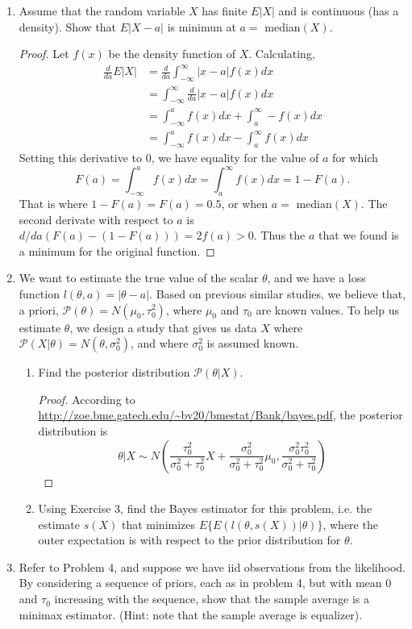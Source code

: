 \documentclass[letterpaper,12pt]{article}
\renewcommand{\P}{\mathcal{P}}
\begin{document}
\begin{enumerate}[(1)]
\begin{proof}
The simulations yielded $2.184648$ for the first expectation and $2.156$ for the second expectation.
\end{proof}

\item
Assume that the random variable $X$ has finite $E|X|$ and is continuous (has a density). Show that $E|X - a|$ is minimun at $a=$ median$(X)$.
\begin{proof}
Let $f(x)$ be the density function of $X$. Calculating,
\begin{align*}
\frac{d}{da} E|X| &= \frac{d}{da} \int_{-\infty}^{\infty} |x - a| f(x) dx \\
&= \int_{-\infty}^{\infty} \frac{d}{da}  |x - a| f(x) dx \\
&= \int_{-\infty}^{a} f(x) dx + \int_{a}^{\infty} - f(x) dx \\
&= \int_{-\infty}^{a} f(x) dx - \int_{a}^{\infty} f(x) dx
\end{align*}
Setting this derivative to $0$, we have equality for the value of $a$ for which
\[
F(a) = \int_{-\infty}^{a} f(x) dx = \int_{a}^{\infty} f(x) dx = 1 - F(a) \text{.}
\]
That is where $1 - F(a) = F(a) = 0.5$, or when $a =$ median$(X)$. The second derivate with respect to $a$ is $d/da(F(a) - (1 - F(a))) = 2f(a) >0$. Thus the $a$ that we found is a minimum for the original function.
\end{proof}

\item
We want to estimate the true value of the scalar $\theta$, and we have a loss function $l(\theta, a) = |\theta - a|$. Based on previous similar studies, we believe that, a priori, $\P(\theta) = N (\mu_0, \tau_0^2)$, where $\mu_0$ and $\tau_0$ are known values. To help us estimate $\theta$, we design a study that gives us data $X$ where 
 $\P(X | \theta) = N(\theta, \sigma_0^2)$, and  where $\sigma_0^2$ is assumed known.
\begin{enumerate}[1.]
\item
Find the posterior distribution $\P(\theta | X)$.
\begin{proof}
According to \url{http://zoe.bme.gatech.edu/~bv20/bmestat/Bank/bayes.pdf}, the posterior distribution is 
\[
\theta | X \sim N \left( \frac{\tau_0^2}{\sigma_0^2 + \tau_0^2} X + \frac{\sigma_0^2}{\sigma_0^2 + \tau_0^2} \mu_0, \frac{\sigma_0^2\tau_0^2}{\sigma_0^2 + \tau_0^2} \right)
\]
\end{proof}
\item
Using Exercise 3, find the Bayes estimator for this problem, i.e. the estimate $s(X)$ that minimizes $E \{E (l ( \theta, s(X)) | \theta  ) \}$, where the outer expectation is with respect to the prior distribution for $\theta$.
\end{enumerate}

\item
Refer to Problem 4, and suppose we have iid observations from the likelihood. By considering a sequence of priors, each as in problem 4, but with mean $0$ and $\tau_0$ increasing with the sequence, show that the sample average is a minimax estimator. (Hint: note that the sample average is equalizer).

\end{enumerate}
\end{document}
